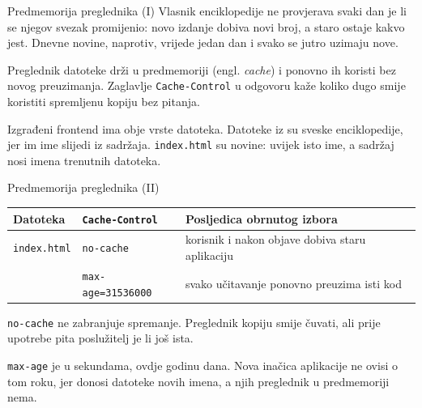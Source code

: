 \begin{frame}{Predmemorija preglednika (I)}
Vlasnik enciklopedije ne provjerava svaki dan je li se njegov svezak promijenio: novo izdanje dobiva novi broj, a staro ostaje kakvo jest. Dnevne novine, naprotiv, vrijede jedan dan i svako se jutro uzimaju nove.

\vspace{0.9em}
Preglednik datoteke drži u predmemoriji (engl. \emph{cache}) i ponovno ih koristi bez novog preuzimanja. Zaglavlje \texttt{Cache-Control} u odgovoru kaže koliko dugo smije koristiti spremljenu kopiju bez pitanja.

\vspace{0.9em}
Izgrađeni frontend ima obje vrste datoteka. Datoteke iz  su sveske enciklopedije, jer im ime slijedi iz sadržaja. \texttt{index.html} su novine: uvijek isto ime, a sadržaj nosi imena trenutnih datoteka.
\end{frame}

\begin{frame}{Predmemorija preglednika (II)}
\vspace{0.3em}
\begin{center}
{\small
\setlength{\tabcolsep}{5pt}
\renewcommand{\arraystretch}{1.4}
\begin{tabular}{@{}L{2.3cm}L{3.2cm}L{5.6cm}@{}}
  \toprule
  \textbf{Datoteka} & \textbf{\texttt{Cache-Control}} & \textbf{Posljedica obrnutog izbora} \\
  \midrule
  \texttt{index.html} & \texttt{no-cache} & korisnik i nakon objave dobiva staru aplikaciju \\
   & \texttt{max-age=31536000} & svako učitavanje ponovno preuzima isti kod \\
  \bottomrule
\end{tabular}
}
\end{center}

\vspace{0.6em}
\texttt{no-cache} ne zabranjuje spremanje. Preglednik kopiju smije čuvati, ali prije upotrebe pita poslužitelj je li još ista.

\vspace{0.4em}
\texttt{max-age} je u sekundama, ovdje godinu dana. Nova inačica aplikacije ne ovisi o tom roku, jer donosi datoteke novih imena, a njih preglednik u predmemoriji nema.
\end{frame}

